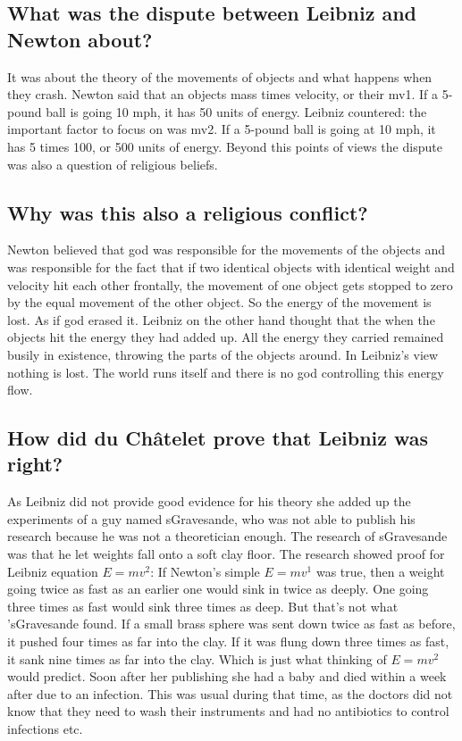 \subsection*{What was the dispute between Leibniz and Newton about?}
It was about the theory of the movements of objects and what happens when they crash. Newton said that an objects mass times velocity, or their mv1. If a 5-pound ball is going 10 mph, it has 50 units of energy. Leibniz countered: the important factor to focus on was mv2. If a 5-pound ball is going at 10 mph, it has 5 times 100, or 500 units of energy. Beyond this points of views the dispute was also a question of religious beliefs. 

\subsection*{Why was this also a religious conflict?}
Newton believed that god was responsible for the movements of the objects and was responsible for the fact that if two identical objects with identical weight and velocity hit each other frontally, the movement of one object gets stopped to zero by the equal movement of the other object. So the energy of the movement is lost. As if god erased it. Leibniz on the other hand thought that the when the objects hit the energy they had added up. All the energy they carried remained busily in existence, throwing the parts of the objects around. In Leibniz's view nothing is lost. The world runs itself and there is no god controlling this energy flow.

\subsection*{How did du Châtelet prove that Leibniz was right?}
As Leibniz did not provide good evidence for his theory she added up the experiments of a guy named sGravesande, who was not able to publish his research because he was not a theoretician enough. The research of sGravesande was that he let weights fall onto a soft clay floor. The research showed proof for Leibniz equation $E=mv^2$: If Newton's simple $E=mv^1$ was true, then a weight going twice as fast as an earlier one would sink in twice as deeply. One going three times as fast would sink three times as deep. But that's not what 'sGravesande found. If a small brass sphere was sent down twice as fast as before, it pushed four times as far into the clay. If it was flung down three times as fast, it sank nine times as far into the clay. Which is just what thinking of $E=mv^2$ would predict. Soon after her publishing she had a baby and died within a week after due to an infection. This was usual during that time, as the doctors did not know that they need to wash their instruments and had no antibiotics to control infections etc.

